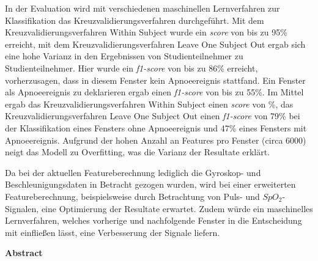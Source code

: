 In der Evaluation wird mit verschiedenen maschinellen Lernverfahren zur Klassifikation das Kreuzvalidierungsverfahren durchgeführt.
Mit dem Kreuzvalidierungsverfahren {\glqq Within Subject\grqq} wurde ein \textit{score} von bis zu 95\% erreicht, mit dem Kreuzvalidierungsverfahren {\glqq Leave One Subject Out\grqq} ergab sich eine hohe Varianz in den Ergebnissen von Studienteilnehmer zu Studienteilnehmer.
Hier wurde ein \textit{f1-score} von bis zu 86\% erreicht, vorherzusagen, dass in diesem Fenster kein Apnoeereignis stattfand. 
Ein Fenster als Apnoeereignis zu deklarieren ergab einen \textit{f1-score} von bis zu 55\%. \newline
Im Mittel ergab das Kreuzvalidierungsverfahren {\glqq Within Subject\grqq} einen \textit{score} von \%, das Kreuzvalidierungsverfahren {\glqq Leave One Subject Out\grqq} einen \textit{f1-score} von 79\% bei der Klassifikation eines Fensters ohne Apnoeereignis und 47\% eines Fensters mit Apnoeereignis.
Aufgrund der hohen Anzahl an Features pro Fenster (circa 6000) neigt das Modell zu Overfitting, was die Varianz der Resultate erklärt.

Da bei der aktuellen Featureberechnung lediglich die Gyroskop- und Beschleunigungsdaten in Betracht gezogen wurden, wird bei einer erweiterten Featureberechnung, beispielsweise      durch Betrachtung von Puls- und $SpO_2$-Signalen, eine Optimierung der Resultate erwartet.
Zudem würde ein maschinelles Lernverfahren, welches vorherige und nachfolgende Fenster in die Entscheidung mit einfließen lässt, eine Verbesserung der Signale liefern.



\cleardoublepage
\vspace*{1em}
\begin{center}
	\textbf{Abstract}
\end{center}

\cleardoublepage
